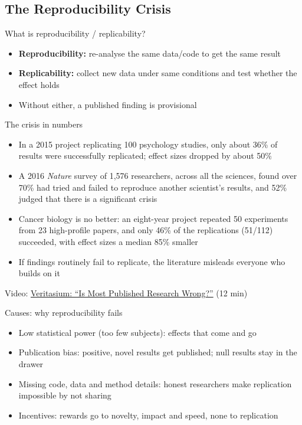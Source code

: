 \documentclass[aspectratio=169]{beamer}
\begin{document}
\subsection{The Reproducibility Crisis}
\begin{frame}{What is reproducibility / replicability?}
\begin{itemize}
  \item \textbf{Reproducibility:} re-analyse the same data/code to get the same result
  \item \textbf{Replicability:} collect new data under same conditions and test whether the effect holds
  \item Without either, a published finding is provisional \citep{goodman2016reproducibility}
\end{itemize}
\end{frame}

\begin{frame}{The crisis in numbers}
\begin{itemize}
\item In a 2015 project replicating 100 psychology studies, only about 36\% of results were successfully replicated; effect sizes dropped by about 50\% \citep{open2015reproducibility}

  \item A 2016 \textit{Nature} survey of 1,576 researchers, across all the sciences, found over 70\% had tried and failed to reproduce another scientist's results, and 52\% judged that there is a significant crisis \citep{baker2016crisis}
  \item Cancer biology is no better: an eight-year project repeated 50 experiments from 23 high-profile papers, and only 46\% of the replications (51/112) succeeded, with effect sizes a median 85\% smaller \citep{errington2021cancer}
  \item If findings routinely fail to replicate, the literature misleads everyone who builds on it
\end{itemize}

\medskip
\small Video: \href{https://www.youtube.com/watch?v=42QuXLucH3Q}{Veritasium: ``Is Most Published Research Wrong?''} (12 min) %
\end{frame}

\begin{frame}{Causes: why reproducibility fails}
\begin{itemize}
\item Low statistical power (too few subjects): effects that come and go
   \citep{ioannidis2005false}
  \item Publication bias: positive, novel results get published; null results stay in the drawer
  \item Missing code, data and method details: honest researchers make replication impossible by not sharing
  \item Incentives: rewards go to novelty, impact and speed, none to replication
\end{itemize}
\end{frame}
\end{document}
